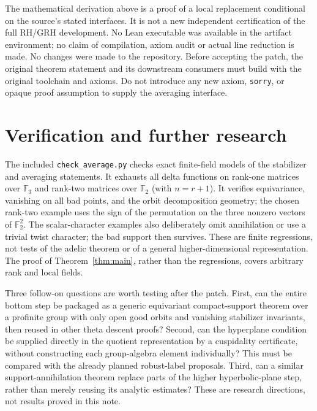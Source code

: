 \documentclass[11pt,letterpaper]{article}
\begin{document}
The mathematical derivation above is a proof of a local replacement conditional on the source's stated interfaces. It is not a new independent certification of the full RH/GRH development. No Lean executable was available in the artifact environment; no claim of compilation, axiom audit or actual line reduction is made. No changes were made to the repository. Before accepting the patch, the original theorem statement and its downstream consumers must build with the original toolchain and axioms. Do not introduce any new axiom, \texttt{sorry}, or opaque proof assumption to supply the averaging interface.

\section{Verification and further research}
The included \texttt{check\_average.py} checks exact finite-field models of the stabilizer and averaging statements. It exhausts all delta functions on rank-one matrices over $\mathbb F_3$ and rank-two matrices over $\mathbb F_2$ (with $n=r+1$). It verifies equivariance, vanishing on all bad points, and the orbit decomposition geometry; the chosen rank-two example uses the sign of the permutation on the three nonzero vectors of $\mathbb F_2^2$. The scalar-character examples also deliberately omit annihilation or use a trivial twist character; the bad support then survives. These are finite regressions, not tests of the adelic theorem or of a general higher-dimensional representation. The proof of Theorem~\ref{thm:main}, rather than the regressions, covers arbitrary rank and local fields.

Three follow-on questions are worth testing after the patch. First, can the entire bottom step be packaged as a generic equivariant compact-support theorem over a profinite group with only open good orbits and vanishing stabilizer invariants, then reused in other theta descent proofs? Second, can the hyperplane condition be supplied directly in the quotient representation by a cuspidality certificate, without constructing each group-algebra element individually? This must be compared with the already planned robust-label proposals. Third, can a similar support-annihilation theorem replace parts of the higher hyperbolic-plane step, rather than merely reusing its analytic estimates? These are research directions, not results proved in this note.
\end{document}
